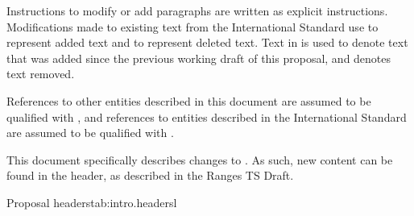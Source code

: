 \pnum
Instructions to modify or add paragraphs are written as explicit instructions.
Modifications made to existing text from the International Standard use
 to represent added text and  to
represent deleted text. Text in  is used to denote text that
was added since the previous working draft of this proposal, and 
denotes text removed.

\pnum
References to other entities described in this document are assumed to be
qualified with , and references to entities
described in the International Standard are assumed to be qualified with .

\pnum
This document specifically describes changes to . As such, new content can be found
in the  header, as described in the Ranges TS Draft.

\begin{floattable}{Proposal headers}{tab:intro.headers}{l}
\topline
{}\\
\bottomline
\end{floattable}
